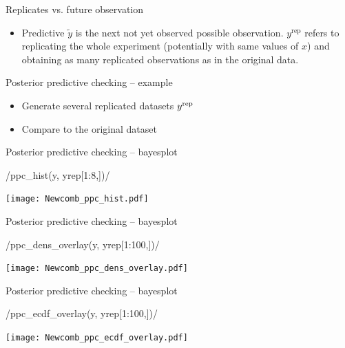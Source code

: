 \documentclass[t]{beamer}
\begin{document}
\begin{frame}{Replicates vs. future observation}

  \begin{itemize}
  \item Predictive $\tilde{y}$ is the next not yet observed possible
    observation. $y^{\mathrm{rep}}$ refers to replicating the whole
    experiment (potentially with same values of $x$) and obtaining as
    many replicated observations as in the original data.
  \end{itemize}

\end{frame}

\begin{frame}{Posterior predictive checking -- example}

  \begin{itemize}
  \item<1-> Generate several replicated datasets $y^{\rm rep}$
  \item<2-> Compare to the original dataset
  \end{itemize}
  \vspace{-1\baselineskip}

\end{frame}

\begin{frame}{Posterior predictive checking -- bayesplot}

  \vspace{-1\baselineskip}
  \rinline/ppc_hist(y, yrep[1:8,])/
  
  \texttt{[image: Newcomb\_ppc\_hist.pdf]}

\end{frame}

\begin{frame}{Posterior predictive checking -- bayesplot}

  \vspace{-1\baselineskip}
  \rinline/ppc_dens_overlay(y, yrep[1:100,])/
  
  \texttt{[image: Newcomb\_ppc\_dens\_overlay.pdf]}

\end{frame}

\begin{frame}{Posterior predictive checking -- bayesplot}

  \vspace{-1\baselineskip}
  \rinline/ppc_ecdf_overlay(y, yrep[1:100,])/
  
  \texttt{[image: Newcomb\_ppc\_ecdf\_overlay.pdf]}

\end{frame}
\end{document}

